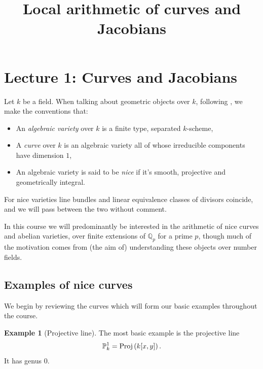 \documentclass[12pt]{amsart}
\numberwithin{equation}{section}
\theoremstyle{remark}
\theoremstyle{definition}
\newtheorem{example}[equation]{Example}
\theoremstyle{definition}
\theoremstyle{definition}
\theoremstyle{definition}
\theoremstyle{definition}
\theoremstyle{definition}
\begin{document}
\title{Local arithmetic of curves and Jacobians}

\maketitle


  


\section{Lecture 1: Curves and Jacobians}

Let $k$ be a field. When talking about geometric objects over $k$, following \cite{MR3729254}, we make the conventions that:
\begin{itemize}
\item An \textit{algebraic variety} over $k$ is a finite type, separated $k$-scheme,
\item A \textit{curve} over $k$ is an algebraic variety all of whose irreducible components have dimension $1$,
\item An algebraic variety is said to be \textit{nice} if it's smooth, projective and geometrically integral.
\end{itemize}
For nice varieties line bundles and linear equivalence classes of divisors coincide, and we will pass between the two without comment.

In this course we will predominantly be interested in the arithmetic of nice curves and abelian varieties, over finite extensions of $\mathbb{Q}_p$ for a prime $p$, though much of the motivation comes from (the aim of) understanding these objects over number fields.

\subsection{Examples of nice curves}

We begin by reviewing the curves which will form our basic examples throughout the course. 

\begin{example}[Projective line]
The most basic example is the projective line \[\mathbb{P}^1_k=\textup{Proj}\left(k[x,y]\right).\]
It has genus $0$.
\end{example}
\end{document}
